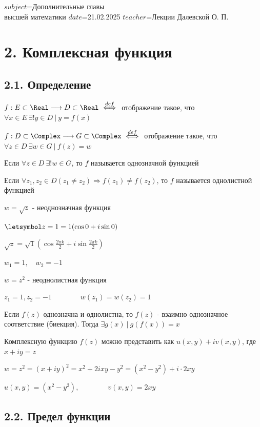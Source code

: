 $subject$=Дополнительные главы \\ высшей математики
$date$=21.02.2025
$teacher$=Лекции Далевской О. П.

\section{2. Комплексная функция}

\hypertarget{complex_function}{}

\subsection{2.1. Определение}

\Mem $f : E \subset \Real \longrightarrow D \subset \Real \ \overset{def}{\Longleftrightarrow} \ $ отображение такое, 
что $\forall x \in E \ \exists! y \in D \ | \ y = f(x)$

\Def $f : D \subset \Complex \longrightarrow G \subset \Complex \ \overset{def}{\Longleftrightarrow} \ $ отображение такое, 
что $\forall z \in D \ \exists w \in G \ | \ f(z) = w$

\Defs Если $\forall z \in D \ \exists! w \in G$, то $f$ называется однозначной функцией

\Defs Если $\forall z_1, z_2 \in D (z_1 \neq z_2) \Longrightarrow f(z_1) \neq f(z_2)$, 
то $f$ называется однолистной функцией

 $w = \sqrt{z}$ - неоднозначная функция

$\letsymbol z = 1 = 1 (\cos 0 + i \sin 0)$

$\sqrt{z} = \sqrt{1} \left(\cos \frac{2\pi k}{2} + i \sin \frac{2\pi k}{2}\right)$

$w_1 = 1, \quad w_2 = -1$

 $w = z^2$ - неоднолистная функция

$z_1 = 1, z_2 = -1 \qquad\qquad w(z_1) = w(z_2) = 1$

\Nota Если $f(z)$ однозначна и однолистна, то $f(z)$ - взаимно однозначное соответствие (биекция). Тогда $\exists g(x) \ | \ g(f(x)) = x$

Комплексную функцию $f(z)$ можно представить как $u(x, y) + i v(x, y)$, где $x + iy = z$

\Ex $w = z^2 = (x + iy)^2 = x^2 + 2ixy - y^2 = (x^2 - y^2) + i \cdot 2xy$

$u(x, y) = (x^2 - y^2), \qquad\qquad v(x, y) = 2xy$

\subsection{2.2. Предел функции}

